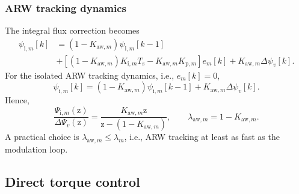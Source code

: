 \begin{frame}
    \frametitle{ARW tracking dynamics}
    The integral flux correction becomes
    \begin{equation}
        \begin{split}
            \psi_{\mathrm{i},m}[k]
             & =(1-K_{\mathrm{aw},m})\psi_{\mathrm{i},m}[k-1]                                                            \\
             & +\left[(1-K_{\mathrm{aw},m})K_{\mathrm{i},m}T_{\mathrm{s}}-K_{\mathrm{aw},m}K_{\mathrm{p},m}\right]e_m[k]
            +K_{\mathrm{aw},m}\Delta\psi_v[k] .
        \end{split}
    \end{equation}
    For the isolated ARW tracking dynamics, i.e., $e_m[k]=0$,
    \begin{equation}
        \psi_{\mathrm{i},m}[k]
        =(1-K_{\mathrm{aw},m})\psi_{\mathrm{i},m}[k-1]
        +K_{\mathrm{aw},m}\Delta\psi_v[k] .
    \end{equation}
    Hence,
    \begin{equation}
        \frac{\Psi_{\mathrm{i},m}(\mathrm{z})}{\Delta\Psi_v(\mathrm{z})}
        =\frac{K_{\mathrm{aw},m}\mathrm{z}}{\mathrm{z}-(1-K_{\mathrm{aw},m})},
        \qquad
        \lambda_{\mathrm{aw},m}=1-K_{\mathrm{aw},m} .
    \end{equation}
    A practical choice is $\lambda_{\mathrm{aw},m}\leq\lambda_m$, i.e., ARW tracking at least as fast as the modulation loop.
\end{frame}

\subsection{Direct torque control}

